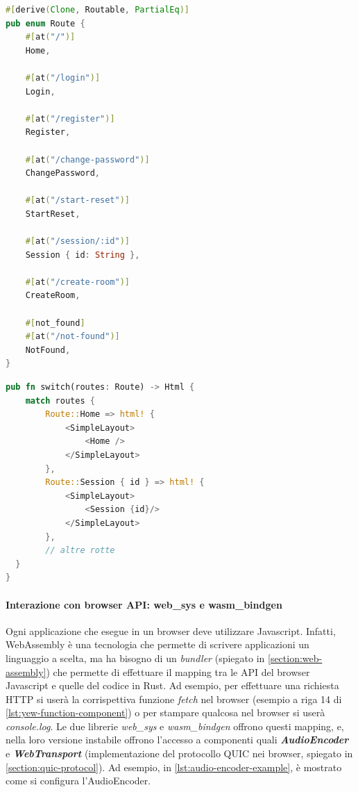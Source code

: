 \documentclass{article}
\begin{document}
\begin{lstlisting}[language=Rust, style=boxed, label={lst:yew-router-component}, captionpos=b,caption={Rotte utilizzate nel frontend}]
#[derive(Clone, Routable, PartialEq)]
pub enum Route {
    #[at("/")]
    Home,

    #[at("/login")]
    Login,

    #[at("/register")]
    Register,

    #[at("/change-password")]
    ChangePassword,

    #[at("/start-reset")]
    StartReset,

    #[at("/session/:id")]
    Session { id: String },

    #[at("/create-room")]
    CreateRoom,

    #[not_found]
    #[at("/not-found")]
    NotFound,
}

\end{lstlisting}

\begin{lstlisting}[language=Rust, style=boxed, label={lst:yew-switch}, captionpos=b,caption={Funzione switch utilizzata per il mapping di rotte con componenti sviluppati}]
pub fn switch(routes: Route) -> Html {
    match routes {
        Route::Home => html! {
            <SimpleLayout>
                <Home />
            </SimpleLayout>
        },
        Route::Session { id } => html! {
            <SimpleLayout>
                <Session {id}/>
            </SimpleLayout>
        },
        // altre rotte
  }
}
\end{lstlisting}

\paragraph{Interazione con browser API: web\_sys e wasm\_bindgen} Ogni applicazione che 
esegue in un browser deve utilizzare Javascript. Infatti, WebAssembly è una tecnologia che
permette di scrivere applicazioni un linguaggio a scelta, ma ha bisogno di un \textit{bundler}
(spiegato in \cref{section:web-assembly}) che permette di 
effettuare il mapping tra le API del browser Javascript e quelle del codice in Rust. Ad
esempio, per effettuare una richiesta HTTP si userà la corrispettiva funzione \textit{fetch}
nel browser (esempio a riga 14 di \cref{lst:yew-function-component}) o per stampare qualcosa
nel browser si userà \textit{console.log}. Le due librerie \textit{web\_sys} e 
\textit{wasm\_bindgen} offrono questi mapping, e, nella loro versione instabile offrono
l'accesso a componenti quali \textbf{\textit{AudioEncoder}} e \textbf{\textit{WebTransport}}
(implementazione del protocollo QUIC nei browser, spiegato in \cref{section:quic-protocol}).
Ad esempio, in \cref{lst:audio-encoder-example}, è mostrato come si configura l'AudioEncoder.
\end{document}

